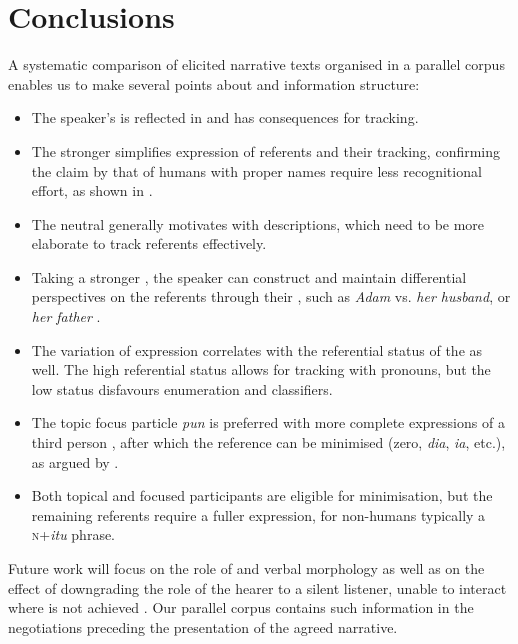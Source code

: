 \documentclass[output=paper
,modfonts
,nonflat]{langsci/langscibook}
\begin{document}

\section{Conclusions}
A systematic comparison of elicited narrative texts organised in a parallel corpus enables us to make several points about   and information structure:

\begin{itemize}
\item The speaker's  is reflected in   and has consequences for  tracking.
\item The stronger  simplifies expression of referents and their tracking, confirming the claim by \cite{SacksSchegloff2007} that  of humans with proper names require less recognitional effort, as shown in .
\item The neutral  generally motivates   with descriptions, which need to be more elaborate to track referents effectively.
\item Taking a stronger , the speaker can construct and maintain differential perspectives on the referents through their , such as \emph{Adam} vs. \emph{her husband}, or \emph{her father} \citep{Stivers2007}.
\item The variation of expression correlates with the referential status of the  as well. The high referential status allows for tracking with pronouns, but the low status disfavours enumeration and classifiers.
\item The topic focus particle \emph{pun} is preferred with more complete expressions of a third person , after which the reference can be minimised (zero, \emph{dia}, \emph{ia}, etc.), as argued by \citet{Heritage2007, SacksSchegloff2007}.
\item Both topical and focused participants are eligible for minimisation, but the remaining referents require a fuller expression, for non-humans typically a \textsc{n}+\emph{itu} phrase.
\end{itemize}

\noindent
Future work will focus on the role of  and verbal morphology as well as on the effect of downgrading the role of the hearer to a silent listener, unable to interact where  is not achieved \citep{DeLancey1997}. Our parallel corpus contains such information in the negotiations preceding the presentation of the agreed narrative. 
\end{document}
